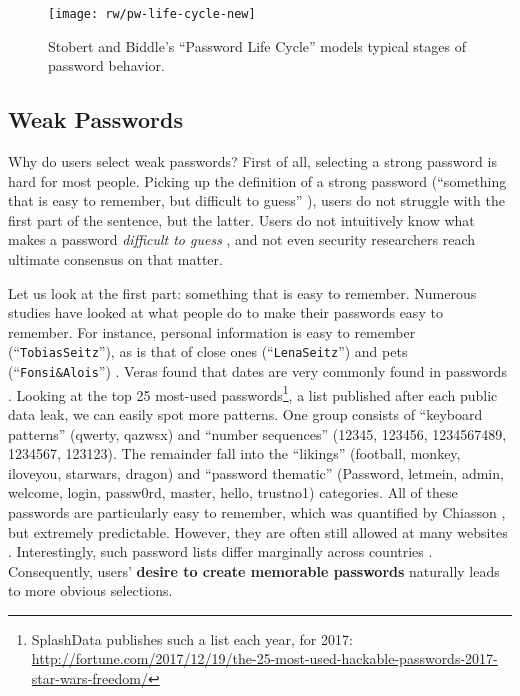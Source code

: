 \begin{figure}[!htbp]
	\centering
	\texttt{[image: rw/pw-life-cycle-new]}
	\caption{\label{fig:rw:pw_life_cycle} Stobert and Biddle's ``Password Life Cycle'' \cite{Stobert2014PasswordLifeCycle} models typical stages of password behavior.}
\end{figure}


	\subsection{Weak Passwords}
	Why do users select weak passwords? 
	First of all, selecting a strong password is hard for most people. %
	Picking up the definition of a strong password (``something that is easy to remember, but difficult to guess'' \cite{Bishop1995ProactivePasswordChecking}), users do not struggle with the first part of the sentence, but the latter. Users do not intuitively know what makes a password \textit{difficult to guess} \cite{Jakobsson2013BenefitsUnderstandingPWs}, and not even security researchers reach ultimate consensus on that matter.  
	
	Let us look at the first part: something that is easy to remember. Numerous studies have looked at what people do to make their passwords easy to remember. For instance, personal information is easy to remember (``\texttt{TobiasSeitz}''), as is that of close ones (``\texttt{LenaSeitz}'') and pets (``\texttt{Fonsi\&Alois}'') \cite{Brown2004GeneratingPWs,Li2017PersonalInformation}. Veras \etal found that dates are very commonly found in passwords \cite{Veras2012VisualizingSemanticsPasswords}. Looking at the top 25 most-used passwords\footnote{SplashData publishes such a list each year, for 2017: \url{http://fortune.com/2017/12/19/the-25-most-used-hackable-passwords-2017-star-wars-freedom/} }, a list published after each public data leak, we can easily spot more patterns. One group consists of ``keyboard patterns'' (qwerty, qazwsx) and ``number sequences'' (12345, 123456, 1234567489, 1234567, 123123). The remainder fall into the ``likings'' (football, monkey, iloveyou, starwars, dragon) and ``password thematic'' (Password, letmein, admin, welcome, login, passw0rd, master, hello, trustno1) categories. All of these passwords are particularly easy to remember, which was quantified by Chiasson \etal \cite{Chiasson2009InterferencesGraphical}, but extremely predictable. However, they are often still allowed at many websites \cite{Seitz2017PoliciesReuse}. Interestingly, such password lists differ marginally across countries \cite{Violettas2014PasswordsAvoidGreece,Wang2015ChinesePWs}. Consequently, users' \textbf{desire to create memorable passwords} naturally leads to more obvious selections. 

